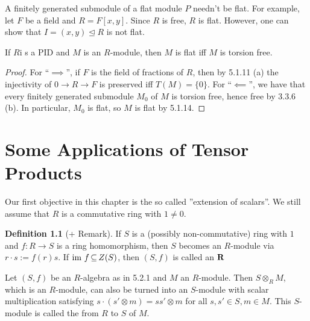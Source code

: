 \documentclass[11pt]{book}
\theoremstyle{definition}   \newtheorem{defn}[counter]{Definition} %
\newcommand{\nsg}{\mathrel{\unlhd}}   \newcommand{\ind}{\parindent24pt}   \newcommand{\vn}{\varnothing}    \newcommand{\lar}{\longrightarrow}
\DeclareMathOperator{\ra}{\rightarrow}   \DeclareMathOperator{\Poly}{\mathbf{P}}   \DeclareMathOperator{\spn}{\textnormal{span}}   \DeclareMathOperator{\aut}{\textnormal{Aut}}
\newcommand{\vs}{\vspace{8pt}}
\numberwithin{counter}{chapter}
\begin{document}
\vs

\begin{remark*}
A finitely generated submodule of a flat module $P$ needn't be flat. For example, let $F$ be a field and $R = F[x,y]$. Since $R$ is free, $R$ is flat. However, one can show that $I = (x,y) \nsg R$ is not flat. 
\end{remark*}

\vs

\begin{corollary}
If $R$i s a PID and $M$ is an $R$-module, then $M$ is flat iff $M$ is torsion free. 
\end{corollary}

\begin{proof}
For ``$\implies$'', if $F$ is the field of fractions of $R$, then by 5.1.11 (a) the injectivity of $0 \ra R \ra F$ is preserved iff $T(M) = \{0\}$. For ``$\impliedby$'', we have that every finitely generated submodule $M_0$ of $M$ is torsion free, hence free by 3.3.6 (b). In particular, $M_0$ is flat, so $M$ is flat by 5.1.14. 
\end{proof}





\chapter{Some Applications of Tensor Products}




Our first objective in this chapter is the so called ''extension of scalars''. We still assume that $R$ is a commutative ring with $1 \ne 0$. 

\vs

\begin{defn}[+ Remark]
If $S$ is a (possibly non-commutative) ring with $1$ and $f : R \ra S$ is a ring homomorphism, then $S$ becomes an $R$-module via $r \cdot s := f(r) s$. If $\textnormal{im } f \operatorname{\subseteq} Z(S)$, then $(S,f)$ is called an $\mathbf{R}$ 
\end{defn}


\vs

\begin{lemma}[+ Definition]
Let $(S,f)$ be an $R$-algebra as in 5.2.1 and $M$ an $R$-module. Then $S \otimes_R M$, which is an $R$-module, can also be turned into an $S$-module with scalar multiplication satisfying $s \cdot (s' \otimes m) = ss' \otimes m$ for all $s,s' \in S, m \in M$. This $S$-module is called the  from $R$ to $S$ of $M$.
\end{lemma}
\end{document}
